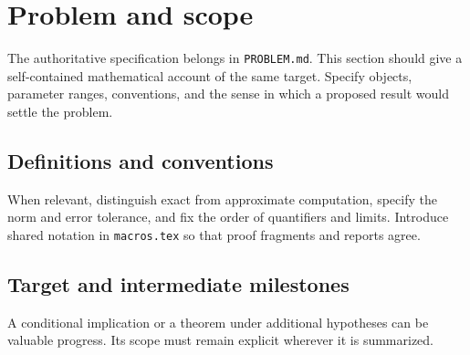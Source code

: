 \section{Problem and scope}\label{sec:problem}


The authoritative specification belongs in \texttt{PROBLEM.md}. This section
should give a self-contained mathematical account of the same target. Specify
objects, parameter ranges, conventions, and the sense in which a proposed
result would settle the problem.

\subsection{Definitions and conventions}

When relevant, distinguish exact from approximate computation, specify the norm
and error tolerance, and fix the order of quantifiers and limits. Introduce
shared notation in \texttt{macros.tex} so that proof fragments and reports agree.

\subsection{Target and intermediate milestones}

A conditional implication or a theorem under additional hypotheses can be
valuable progress. Its scope must remain explicit wherever it is summarized.


